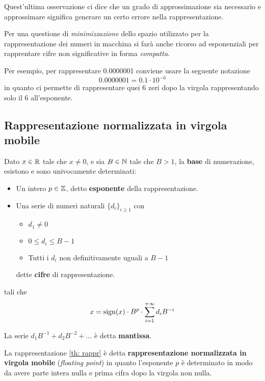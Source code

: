 Quest'ultima osservazione ci dice che un grado di approssimazione sia necessario e approssimare significa
generare un certo errore nella rappresentazione.

Per una questione di \emph{minimizzazione} dello spazio utilizzato per la rappresentazione dei numeri in
macchina si farà anche ricorso ad esponenziali per rapprentare cifre non significative in forma \emph{compatta}.

\begin{example}
	Per esempio, per rappresentare 0.0000001 conviene usare la seguente notazione
	\[ 0.0000001 = 0.1 \cdot 10^{-6} \]
	in quanto ci permette di rappresentare quei 6 zeri dopo la virgola rappresentando solo il 6 all'esponente.
\end{example}

\subsection{Rappresentazione normalizzata in virgola mobile}
\begin{theorem}[Rappresentazione]\label{th: rappr}
	Dato $x \in \mathbb{R}$ tale che $x \neq 0$, e sia $B \in \mathbb{N}$ tale che $B > 1$, la \textbf{base} di numerazione,
	esistono e sono univocamente determinati:
	\begin{itemize}
		\item Un intero $p \in \mathbb{Z}$, detto \textbf{esponente} della rappresentazione.
		\item Una serie di numeri naturali $\{ d_i \}_{i \geq 1}$ con
		      \begin{itemize}
			      \item $d_1 \neq 0$
			      \item $0 \leq d_i \leq B - 1$
			      \item Tutti i $d_i$ non definitivamente uguali a $B - 1$
		      \end{itemize}
		      dette \textbf{cifre} di rappresentazione.
	\end{itemize}
	tali che
	\[ x = \operatorname{sign}(x) \cdot B^p \cdot \sum_{i=1}^{+\infty} d_i B^{-i} \]
\end{theorem}

\begin{definition}
	La serie $d_1 B^{-1} + d_2 B^{-2} + \dots$ è detta \textbf{mantissa}.
\end{definition}

La rappresentazione \ref{th: rappr} è detta \textbf{rappresentazione normalizzata in virgola mobile}
(\emph{floating point}) in quanto l'esponente $p$ è determinato in modo da avere parte intera nulla e prima
cifra dopo la virgola non nulla.

